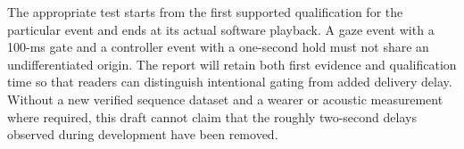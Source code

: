 The appropriate test starts from the first supported qualification for the particular event and ends at its actual software playback. A gaze event with a 100-ms gate and a controller event with a one-second hold must not share an undifferentiated origin. The report will retain both first evidence and qualification time so that readers can distinguish intentional gating from added delivery delay. Without a new verified sequence dataset and a wearer or acoustic measurement where required, this draft cannot claim that the roughly two-second delays observed during development have been removed.
